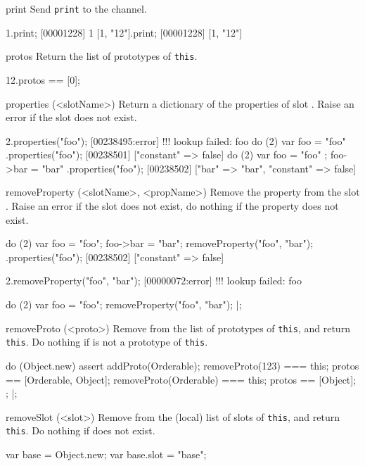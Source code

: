 \begin{urbiscriptapi}
\item[print]
  Send \lstinline|print| to the  channel.
\begin{urbiscript}
1.print;
[00001228] 1
[1, "12"].print;
[00001228] [1, "12"]
\end{urbiscript}

\item[protos]
  Return the list of prototypes of \lstinline|this|.
\begin{urbiassert}
12.protos == [0];
\end{urbiassert}

\item[properties](<slotName>)%
  Return a dictionary of the properties of slot .  Raise
  an error if the slot does not exist.
\begin{urbiscript}
2.properties("foo");
[00238495:error] !!! lookup failed: foo
do (2) { var foo = "foo" }.properties("foo");
[00238501] ["constant" => false]
do (2) { var foo = "foo" ; foo->bar = "bar" }.properties("foo");
[00238502] ["bar" => "bar", "constant" => false]
\end{urbiscript}

\item[removeProperty](<slotName>, <propName>)%
  Remove the property  from the slot .
  Raise an error if the slot does not exist, do nothing if the
  property does not exist.
\begin{urbiscript}
do (2)
{
  var foo = "foo";
  foo->bar = "bar";
  removeProperty("foo", "bar");
}.properties("foo");
[00238502] ["constant" => false]

2.removeProperty("foo", "bar");
[00000072:error] !!! lookup failed: foo

do (2)
{
  var foo = "foo";
  removeProperty("foo", "bar");
}|;
\end{urbiscript}

\item[removeProto](<proto>)%
  Remove  from the list of prototypes of \lstinline|this|,
  and return \lstinline|this|.  Do nothing if  is not a
  prototype of \lstinline|this|.
\begin{urbiscript}
do (Object.new)
{
  assert
  {
    addProto(Orderable);
    removeProto(123) === this;
    protos == [Orderable, Object];
    removeProto(Orderable) === this;
    protos == [Object];
  };
}|;
\end{urbiscript}

\item[removeSlot](<slot>)%
  Remove  from the (local) list of slots of
  \lstinline|this|, and return \lstinline|this|.  Do nothing if
   does not exist.
\begin{urbiscript}
{
  var base = Object.new;
  var base.slot = "base";

}
\end{urbiscript}
\end{urbiscriptapi}
